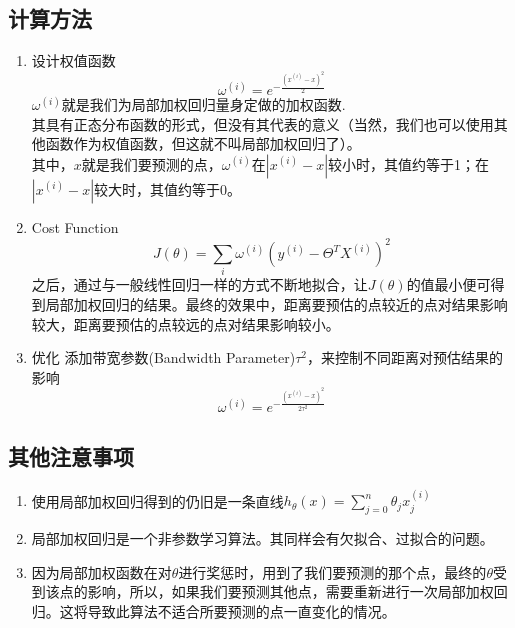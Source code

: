 \subsection{计算方法}
\begin{enumerate}
	\item 设计权值函数
	\begin{equation}
		\omega^{(i)} = e^{-\frac{(x^{(i)}-x)^2}{2}}
	\end{equation}
	$\omega^{(i)}$就是我们为局部加权回归量身定做的加权函数. \\
	其具有正态分布函数的形式，但没有其代表的意义（当然，我们也可以使用其他函数作为权值函数，但这就不叫局部加权回归了）。\\
	其中，$x$就是我们要预测的点，$\omega^{(i)}$在$|x^{(i)}-x|$较小时，其值约等于1；在$|x^{(i)}-x|$较大时，其值约等于0。\\
	\item Cost Function
	\begin{equation}
		J(\theta) = \sum_{i}\omega^{(i)}(y^{(i)} - \Theta^TX^{(i)})^2
	\end{equation}
	之后，通过与一般线性回归一样的方式不断地拟合，让$J(\theta)$的值最小便可得到局部加权回归的结果。最终的效果中，距离要预估的点较近的点对结果影响较大，距离要预估的点较远的点对结果影响较小。
	\item 优化
	添加带宽参数(Bandwidth Parameter)$\tau^2$，来控制不同距离对预估结果的影响
	\begin{equation}
		\omega^{(i)} = e^{-\frac{(x^{(i)}-x)^2}{2\tau^2}}
	\end{equation}
	
\end{enumerate}

\subsection{其他注意事项}
\begin{enumerate}
	\item 使用局部加权回归得到的仍旧是一条直线$h_{\theta}(x)= \sum_{j=0}^n\theta_jx_j^{(i)}$
	\item 局部加权回归是一个非参数学习算法。其同样会有欠拟合、过拟合的问题。
	\item 因为局部加权函数在对$\theta$进行奖惩时，用到了我们要预测的那个点，最终的$\theta$受到该点的影响，所以，如果我们要预测其他点，需要重新进行一次局部加权回归。这将导致此算法不适合所要预测的点一直变化的情况。
\end{enumerate}







